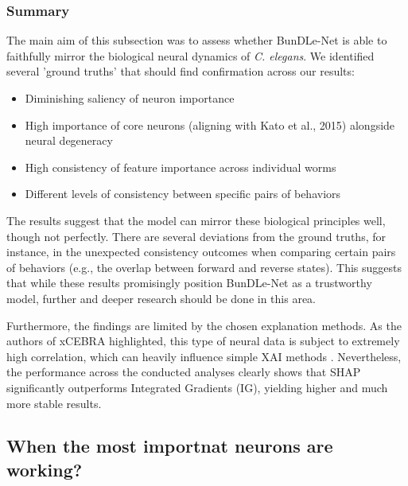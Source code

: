 \documentclass{article}
\begin{document}
\subsubsection{Summary}

The main aim of this subsection was to assess whether BunDLe-Net
is able to faithfully mirror the biological neural dynamics of 
\textit{C. elegans}. We identified several 'ground truths' 
that should find confirmation across our results:

\begin{itemize}
    \item Diminishing saliency of neuron importance
    \item High importance of core neurons (aligning with Kato et al., 2015) alongside neural degeneracy
    \item High consistency of feature importance across individual worms
    \item Different levels of consistency between specific pairs of behaviors
\end{itemize}

The results suggest that the model
 can mirror these biological principles well, 
 though not perfectly. There are several deviations 
 from the ground truths, for instance, in the unexpected 
 consistency outcomes when comparing certain pairs of behaviors 
 (e.g., the overlap between forward and reverse states). 
 This suggests that while these results promisingly 
 position BunDLe-Net as a trustworthy model, further and 
 deeper research should be done in this area. 

Furthermore, the findings are limited by the 
chosen explanation methods. As the authors of 
xCEBRA highlighted, this type of neural data is 
subject to extremely high correlation, which can 
heavily influence simple XAI methods \cite{schneider2025time}. Nevertheless, the performance 
across the conducted analyses clearly shows that SHAP significantly 
outperforms Integrated Gradients (IG), yielding higher and much more 
stable results.








\subsection{When the most importnat neurons are working?}

\printbibliography
\end{document}
